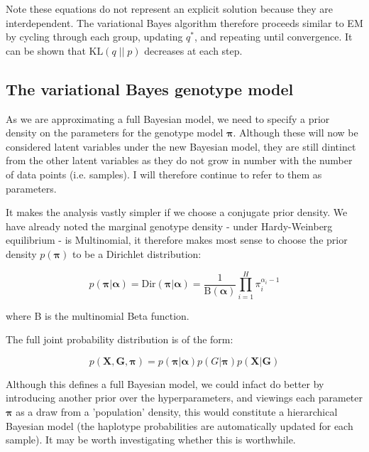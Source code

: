 \documentclass{article}
\begin{document}
Note these equations do not represent an explicit solution because they are interdependent. The variational Bayes algorithm therefore proceeds similar to EM by cycling through each group, updating $q^*$, and repeating until convergence. It can be shown that $\text{KL}(q\; ||\; p)$ decreases at each step.

\subsection{The variational Bayes genotype model}

As we are approximating a full Bayesian model, we need to specify a prior density on the parameters for the genotype model $\boldsymbol{\pi}$. Although these will now be considered latent variables under the new Bayesian model, they are still dintinct from the other latent variables as they do not grow in number with the number of data points (i.e. samples). I will therefore continue to refer to them as parameters. 

It makes the analysis vastly simpler if we choose a conjugate prior density. We have already noted the marginal genotype density - under Hardy-Weinberg equilibrium - is Multinomial, it therefore makes most sense to choose the prior density $p(\boldsymbol{\pi})$ to be a Dirichlet distribution:

\begin{equation}
p(\boldsymbol{\pi} | \boldsymbol{\alpha}) = \text{Dir}(\boldsymbol{\pi} | \boldsymbol{\alpha}) = \frac{1}{\text{B}(\boldsymbol{\alpha})} \prod_{i = 1}^H \pi_i^{\alpha_i - 1}
\end{equation}

where B is the multinomial Beta function.

The full joint probability distribution is of the form:

\begin{equation}
p(\boldsymbol{X}, \boldsymbol{G}, \boldsymbol{\pi}) = p(\boldsymbol{\pi} | \boldsymbol{\alpha}) p(G | \boldsymbol{\pi}) p(\boldsymbol{X} | \boldsymbol{G})
\end{equation}

Although this defines a full Bayesian model, we could infact do better by introducing another prior over the hyperparameters, and viewings each parameter $\boldsymbol{\pi}$ as a draw from a 'population' density, this would constitute a hierarchical Bayesian model (the haplotype probabilities are automatically updated for each sample). It may be worth investigating whether this is worthwhile. 
\end{document}
